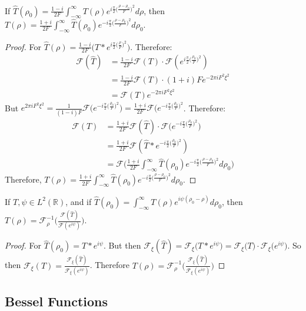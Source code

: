 \documentclass[crop=false,class=book,oneside]{standalone}
\begin{document}
            \begin{theorem}
            If $\hat{T}(\rho_0) = \frac{1-i}{2F}\int_{-\infty}^{\infty}T(\rho) e^{i\frac{\pi}{2}\big(\frac{\rho-\rho_0}{F}\big)^2}d\rho$, then $T(\rho) = \frac{1+i}{2F}\int_{-\infty}^{\infty}\hat{T}(\rho_0)e^{-i\frac{\pi}{2}\big(\frac{\rho-\rho_0}{F}\big)^2}d\rho_0$.
            \end{theorem}
            \begin{proof}
            For $\hat{T}(\rho) = \frac{1-i}{2F}(T* e^{i \frac{\pi}{2}\big(\frac{\rho}{F}\big)^2}\big)$. Therefore:
            \begin{align*}
            \mathcal{F}(\hat{T})&=\frac{1-i}{2F}\mathcal{F}(T)\cdot \mathcal{F}(e^{i\frac{\pi}{2}\big(\frac{\rho_0}{F}\big)^2})\\
            &=\frac{1-i}{2F}\mathcal{F}(T)\cdot(1+i)Fe^{-2\pi i F^2 \xi^2}\\
            &=\mathcal{F}(T)e^{-2\pi i F^2 \xi^2}
            \end{align*}
            But $e^{2\pi iF^{2}\xi^{2}}=\frac{1}{(1-i)F}\mathcal{F}\big(e^{-i\frac{\pi}{2}\big(\frac{\rho_0}{F}\big)^2}\big) = \frac{1+i}{2F} \mathcal{F}\big(e^{-i\frac{\pi}{2}\big(\frac{\rho_0}{F}\big)^2}$. Therefore:
            \begin{align*}
            \mathcal{F}(T)&=\frac{1+i}{2F}\mathcal{F}(\hat{T})\cdot\mathcal{F}\big(e^{-i\frac{\pi}{2}\big(\frac{\rho_0}{F}\big)^2}\big)\\
            &=\frac{1+i}{2F}\mathcal{F}(\hat{T}*e^{-i\frac{\pi}{2}\big(\frac{\rho_0}{F}\big)^2})\\
            &=\mathcal{F}\bigg(\frac{1+i}{2F}\int_{-\infty}^{\infty} \hat{T}(\rho_0)e^{-i\frac{\pi}{2}\big(\frac{\rho - \rho_0}{F}\big)^2} d\rho_0\bigg)
            \end{align*}
            Therefore, $T(\rho) = \frac{1+i}{2F}\int_{-\infty}^{\infty}\hat{T}(\rho_0)e^{-i\frac{\pi}{2}\big(\frac{\rho - \rho_0}{F}\big)^2}d\rho_0$.
            \end{proof}
            
            \begin{theorem}
            If $T,\psi \in L^2(\mathbb{R})$, and if $\hat{T}(\rho_0) = \int_{-\infty}^{\infty} T(\rho)e^{i\psi(\rho_0-\rho)}d\rho_0$, then $T(\rho) = \mathcal{F}^{-1}_{\rho}\big(\frac{\mathcal{F}(\hat{T})}{\mathcal{F}(e^{i\psi})}\big)$.
            \end{theorem}
            \begin{proof}
            For $\hat{T}(\rho_0) = T* e^{i\psi}$. But then $\mathcal{F}_{\xi}(\hat{T}) = \mathcal{F}_{\xi}\big(T* e^{i\psi}\big) = \mathcal{F}_{\xi}\big(T\big)\cdot \mathcal{F}_{\xi}\big(e^{i\psi}\big)$. So then $\mathcal{F}_{\xi}(T) = \frac{\mathcal{F}_{\xi}(\hat{T})}{\mathcal{F}_{\xi}(e^{i\psi})}$. Therefore $T(\rho) = \mathcal{F}^{-1}_{\rho}\big(\frac{\mathcal{F}_{\xi}(\hat{T})}{\mathcal{F}_{\xi}(e^{i\psi})}\big)$
            \end{proof}
        \subsection{Bessel Functions}
\end{document}
